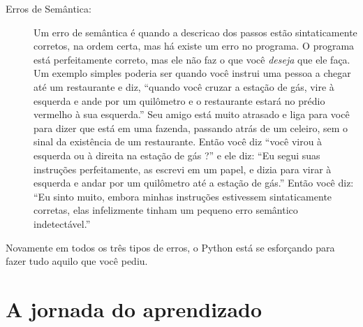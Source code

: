\begin{description}
\item[Erros de Semântica:] Um erro de semântica é quando a descricao dos passos estão
sintaticamente corretos, na ordem certa, mas há existe um erro no programa. O programa
está perfeitamente correto, mas ele não faz o que você {\em deseja} que ele faça. Um
exemplo simples poderia ser quando você instrui uma pessoa a chegar até um restaurante
e diz, ``quando você cruzar a estação de gás, vire à esquerda e ande por um quilômetro e o
restaurante estará no prédio vermelho à sua esquerda.'' Seu amigo está muito atrasado
e liga para você para dizer que está em uma fazenda, passando atrás de um celeiro, sem o sinal
da existência de um restaurante. Então você diz ``você virou à esquerda ou à direita na
estação de gás ?'' e ele diz: ``Eu segui suas instruções perfeitamente, as escrevi em um papel,
e dizia para virar à esquerda e andar por um quilômetro até a estação de gás.'' Então
você diz: ``Eu sinto muito, embora minhas instruções estivessem sintaticamente corretas,
elas infelizmente tinham um pequeno erro semântico indetectável.''
%

\end{description}
%

Novamente em todos os três tipos de erros, o Python está se esforçando para
fazer tudo aquilo que você pediu.
%

\section{A jornada do aprendizado}
%

